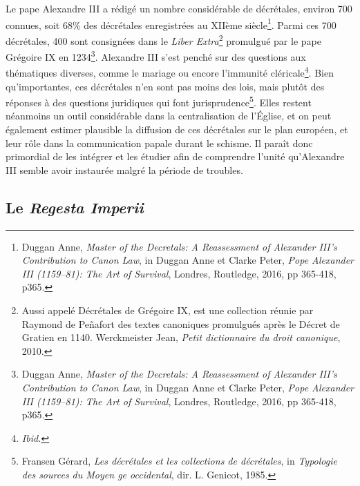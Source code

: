 Le pape Alexandre III a rédigé un nombre considérable de décrétales, environ 700 connues, soit 68\% des décrétales enregistrées au XIIème siècle\footnote{ Duggan Anne, \textit{Master of the Decretals: A Reassessment of Alexander III’s Contribution to Canon Law}, in Duggan Anne et Clarke Peter, \textit{Pope Alexander III (1159–81): The Art of Survival}, Londres, Routledge, 2016, pp 365-418, p365.}. Parmi ces 700 décrétales, 400 sont consignées dans le \textit{Liber Extra}\footnote{Aussi appelé Décrétales de Grégoire IX, est une collection réunie par Raymond de Peñafort des textes canoniques promulgués après le Décret de Gratien en 1140. Werckmeister Jean, \textit{Petit dictionnaire du droit canonique}, 2010.} promulgué par le pape Grégoire IX en 1234\footnote{Duggan Anne, \textit{Master of the Decretals: A Reassessment of Alexander III’s Contribution to Canon Law}, in Duggan Anne et Clarke Peter, \textit{Pope Alexander III (1159–81): The Art of Survival}, Londres, Routledge, 2016, pp 365-418, p365.}. Alexandre III s’est penché sur des questions aux thématiques diverses, comme le mariage ou encore l’immunité cléricale\footnote{\textit{Ibid.}}. Bien qu’importantes, ces décrétales n’en sont pas moins des lois, mais plutôt des réponses à des questions juridiques qui font jurisprudence\footnote{Fransen Gérard, \textit{Les décrétales et les collections de décrétales}, in \textit{Typologie des sources du Moyen  ge occidental}, dir. L. Genicot, 1985.}. Elles restent néanmoins un outil considérable dans la centralisation de l'Église, et on peut également estimer plausible la diffusion de ces décrétales sur le plan européen, et leur rôle dans la communication papale durant le schisme. Il paraît donc primordial de les intégrer et les étudier afin de comprendre l’unité qu’Alexandre III semble avoir instaurée malgré la période de troubles.

 
    \subsection{Le \textit{Regesta Imperii}}

